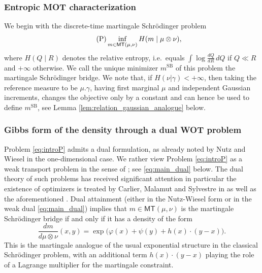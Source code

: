 \documentclass[reqno, a4paper]{amsart}
\newcommand{\msb}{m^{\text{SB}}}
\theoremstyle{plain}
\theoremstyle{definition}
\theoremstyle{remark}
\numberwithin{equation}{section}
\numberwithin{theorem}{section}
\newcommand{\MT}{\mathsf{MT}}
\newcommand{\Cpl}{\mathsf{Cpl}}
\newcommand{\cpl}{\Cpl}
\newcommand{\bary}{\operatorname{bary}}
\begin{document}
	
	
	\subsubsection{Entropic MOT characterization}
	
	We begin with the discrete-time martingale Schr\"odinger problem
	\begin{align}\label{eq:introP} \tag{\text{P}}
		\inf_{m\in \MT(\mu,\nu)} H(m\mid \mu\otimes \nu),
	\end{align}
	where $H(Q\mid R)$ denotes the relative entropy, i.e.\ equals $\int \log\frac{dQ}{dR}\, dQ$ if $Q\ll R$ and $+\infty$ otherwise.
	We call the unique minimizer \(\msb\) of this problem the martingale Schr\"odinger bridge.
	We note that, if $H(\nu|\gamma) < +\infty$, then taking the reference measure to be \(\mu.\gamma\), having first marginal $\mu$ and independent Gaussian increments, changes the objective only by a constant and can hence be used to define \(\msb\), see Lemma \ref{lem:relation_gaussian_analogue} below.
	
	
	\subsubsection{Gibbs form of the density through a dual WOT problem}
	
	
	Problem \eqref{eq:introP} admits a dual formulation, as already noted by Nutz and Wiesel \cite{NuWi22} in the one-dimensional case. We rather view Problem \eqref{eq:introP} as a weak transport problem in the sense of \cite{GoRoSaSh18}; see \eqref{eq:main_dual} below. The dual theory of such problems has received significant attention 
	\cite{GoRoSaTe17, AlBoCh18, BaBePa18, BaPa20, BePaRiSc25} in particular the existence of optimizers is treated by Carlier, Malamut and Sylvestre in \cite{CaMaSy25} as well as the aforementioned \cite{HaPaSc26}. Dual attainment (either in the Nutz-Wiesel form or in the weak dual \eqref{eq:main_dual}) 
	implies that \(m\in \MT(\mu,\nu)\) is the martingale Schr\"odinger bridge if and only if it has a density of the form
	\begin{equation}\label{eq:introGibbs}
		\frac{dm}{d\mu\otimes \nu}(x,y)
		=
		\exp\big(\varphi(x)+\psi(y)+h(x)\cdot(y-x)\big).
	\end{equation}
	This is the martingale analogue of the usual exponential structure in the classical Schr\"odinger problem, with an additional term \(h(x)\cdot(y-x)\) playing the role of a Lagrange multiplier for the martingale constraint.
	
\end{document}
